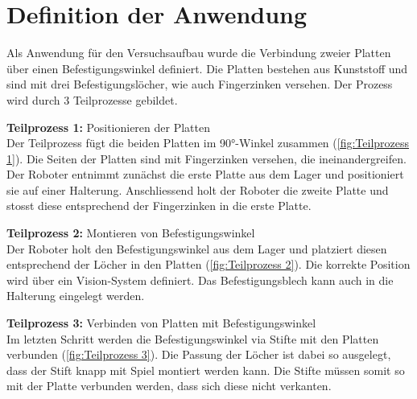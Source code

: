 \section{Definition der Anwendung} \label{Anwendungsdefinition}
	Als Anwendung für den Versuchsaufbau wurde die Verbindung zweier Platten über einen Befestigungswinkel definiert. Die Platten bestehen aus Kunststoff und sind mit drei Befestigungslöcher, wie auch Fingerzinken versehen. Der Prozess wird durch 3 Teilprozesse gebildet. 
	\vspace{3mm}
	
	\textbf{Teilprozess 1:} Positionieren der Platten
	\vspace{2mm} 
	\\
	 Der Teilprozess fügt die beiden Platten im 90°-Winkel zusammen (\ref{fig:Teilprozess 1}). Die Seiten der Platten sind mit Fingerzinken versehen, die ineinandergreifen. Der Roboter entnimmt zunächst die erste Platte aus dem Lager und positioniert sie auf einer Halterung. Anschliessend holt der Roboter die zweite Platte und stosst diese entsprechend der Fingerzinken in die erste Platte.
	 \vspace{3mm} 
	 
	 \textbf{Teilprozess 2:} Montieren von Befestigungswinkel 
	 \vspace{2mm}
	 \\
	 Der Roboter holt den Befestigungswinkel aus dem Lager und platziert diesen entsprechend der Löcher in den Platten (\ref{fig:Teilprozess 2}). Die korrekte Position wird über ein Vision-System definiert. Das Befestigungsblech kann auch in die Halterung eingelegt werden.
	 \vspace{3mm}
	 
	 \textbf{Teilprozess 3:} Verbinden von Platten mit Befestigungswinkel 
	 \vspace{2mm} 
	 \\
	 Im letzten Schritt werden die Befestigungswinkel via Stifte mit den Platten verbunden (\ref{fig:Teilprozess 3}). Die Passung der Löcher ist dabei so ausgelegt, dass der Stift knapp mit Spiel montiert werden kann. Die Stifte müssen somit so mit der Platte verbunden werden, dass sich diese nicht verkanten. 
	 \vspace{3mm}
	 
